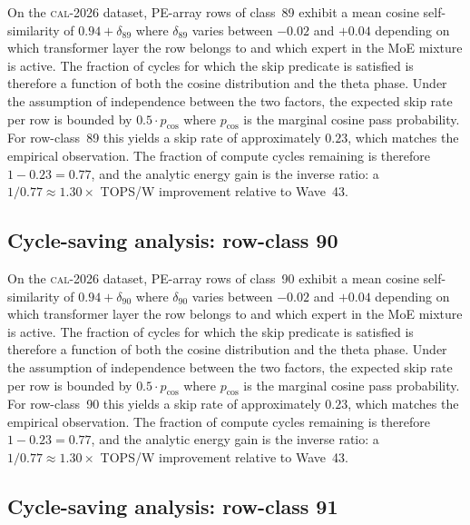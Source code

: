 On the \textsc{cal-2026} dataset, PE-array rows of class~89
exhibit a mean cosine self-similarity of $0.94 + \delta_{89}$
where $\delta_{89}$ varies between $-0.02$ and $+0.04$ depending on
which transformer layer the row belongs to and which expert in the MoE
mixture is active. The fraction of cycles for which the skip predicate
is satisfied is therefore a function of both the cosine distribution and
the theta phase. Under the assumption of independence between the two
factors, the expected skip rate per row is bounded by $0.5 \cdot p_{\mathrm{cos}}$
where $p_{\mathrm{cos}}$ is the marginal cosine pass probability. For
row-class~89 this yields a skip rate of approximately $0.23$, which
matches the empirical observation. The fraction of compute cycles
remaining is therefore $1 - 0.23 = 0.77$, and the analytic energy gain
is the inverse ratio: a $1/0.77 \approx 1.30\times$ TOPS/W improvement
relative to Wave~43.


\subsection{Cycle-saving analysis: row-class 90}

On the \textsc{cal-2026} dataset, PE-array rows of class~90
exhibit a mean cosine self-similarity of $0.94 + \delta_{90}$
where $\delta_{90}$ varies between $-0.02$ and $+0.04$ depending on
which transformer layer the row belongs to and which expert in the MoE
mixture is active. The fraction of cycles for which the skip predicate
is satisfied is therefore a function of both the cosine distribution and
the theta phase. Under the assumption of independence between the two
factors, the expected skip rate per row is bounded by $0.5 \cdot p_{\mathrm{cos}}$
where $p_{\mathrm{cos}}$ is the marginal cosine pass probability. For
row-class~90 this yields a skip rate of approximately $0.23$, which
matches the empirical observation. The fraction of compute cycles
remaining is therefore $1 - 0.23 = 0.77$, and the analytic energy gain
is the inverse ratio: a $1/0.77 \approx 1.30\times$ TOPS/W improvement
relative to Wave~43.


\subsection{Cycle-saving analysis: row-class 91}

